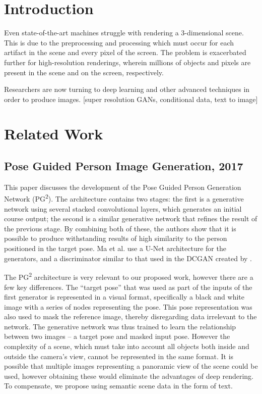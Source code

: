 \documentclass{article}
\begin{document}
\section{Introduction}
\label{sec:introduction}
Even state-of-the-art machines struggle with rendering a 3-dimensional scene. This is due to the preprocessing and processing which must occur for each artifact in the scene and every pixel of the screen. The problem is exacerbated further for high-resolution renderings, wherein millions of objects and pixels are present in the scene and on the screen, respectively.

Researchers are now turning to deep learning and other advanced techniques in order to produce images. [super resolution GANs, conditional data, text to image]

\section{Related Work}
\label{sec:related}

\subsection*{Pose Guided Person Image Generation, 2017}
\nocite{pg2}
This paper discusses the development of the Pose Guided Person Generation
Network (PG\textsuperscript{2}). The architecture contains two stages:
the first is a generative network using several stacked convolutional layers,
which generates an initial course output;
the second is a similar generative network that refines the
result of the previous stage. By combining both of these,
the authors show that it is possible to produce withstanding results of
high similarity to the person positioned in the target pose.
Ma et al. use a U-Net architecture for the generators, and a discriminator
similar to that used in the DCGAN created by
\cite{unsupervised_representational}.

The PG\textsuperscript{2} architecture is very relevant to our proposed work,
however there are a few key differences. The ``target pose'' that was used as 
part of the inputs of the first generator is represented in a visual format,
specifically a black and white image with a series of nodes representing the
pose. This pose representation was also used to mask the reference image,
thereby disregarding data irrelevant to the network.
The generative network was thus trained to learn the relationship between two
images -- a target pose and masked input pose. However the complexity of a scene,
which must take into account all objects both
inside and outside the camera's view, cannot be represented in the same format.
It is possible that multiple images representing a panoramic view of the scene
could be used, however obtaining these would eliminate the advantages of deep
rendering. To compensate,
we propose using semantic scene data in the form of text.
\end{document}
